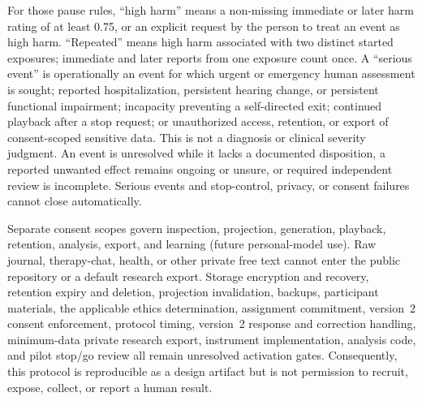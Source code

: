 For those pause rules, ``high harm'' means a non-missing immediate or later harm
rating of at least 0.75, or an explicit request by the person to treat an event
as high harm. ``Repeated'' means high harm associated with two distinct started
exposures; immediate and later reports from one exposure count once. A
``serious event'' is operationally an event for which urgent or emergency human
assessment is sought; reported hospitalization, persistent hearing change, or
persistent functional impairment; incapacity preventing a self-directed exit;
continued playback after a stop request; or unauthorized access, retention, or
export of consent-scoped sensitive data. This is not a diagnosis or clinical
severity judgment. An event is unresolved while it lacks a documented
disposition, a reported unwanted effect remains ongoing or unsure, or required
independent review is incomplete. Serious events and stop-control, privacy, or
consent failures cannot close automatically.

Separate consent scopes govern inspection, projection, generation, playback,
retention, analysis, export, and learning (future personal-model use). Raw journal,
therapy-chat, health, or other private free text cannot enter the public
repository or a default research export. Storage encryption and recovery,
retention expiry and deletion, projection invalidation, backups, participant
materials, the applicable ethics determination, assignment commitment,
version~2 consent enforcement, protocol timing, version~2 response and
correction handling, minimum-data private research export, instrument
implementation, analysis code, and pilot stop/go review all remain unresolved
activation gates. Consequently, this protocol is reproducible as a design
artifact but is not permission to recruit, expose, collect, or report a human
result.
